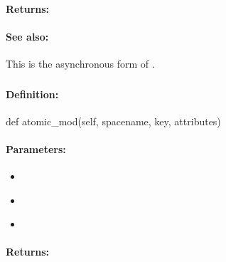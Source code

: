 \paragraph{Returns:}


\paragraph{See also:}  This is the asynchronous form of .

\pagebreak
\subsubsection{}
\label{api:python:atomic_mod}


\paragraph{Definition:}
\begin{pythoncode}
def atomic_mod(self, spacename, key, attributes)
\end{pythoncode}

\paragraph{Parameters:}
\begin{itemize}[noitemsep]
\item {}\\

\item {}\\

\item {}\\

\end{itemize}

\paragraph{Returns:}


\pagebreak
\subsubsection{}
\label{api:python:async_atomic_mod}


